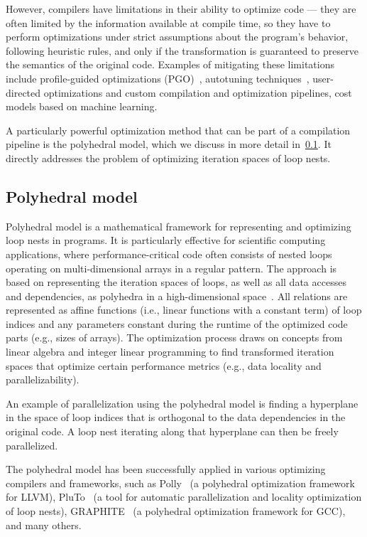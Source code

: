However, compilers have limitations in their ability to optimize code --- they are often limited by the information available at compile time, so they have to perform optimizations under strict assumptions about the program's behavior, following heuristic rules, and only if the transformation is guaranteed to preserve the semantics of the original code.
Examples of mitigating these limitations include profile-guided optimizations (PGO)~, autotuning techniques~, user-directed optimizations and custom compilation and optimization pipelines, cost models based on machine learning.

A particularly powerful optimization method that can be part of a compilation pipeline is the polyhedral model, which we discuss in more detail in~\cref{sec:polyhedral-model}. It directly addresses the problem of optimizing iteration spaces of loop nests.


\subsection{Polyhedral model}\label{sec:polyhedral-model}

Polyhedral model is a mathematical framework for representing and optimizing loop nests in programs. It is particularly effective for scientific computing applications, where performance-critical code often consists of nested loops operating on multi-dimensional arrays in a regular pattern. The approach is based on representing the iteration spaces of loops, as well as all data accesses and dependencies, as polyhedra in a high-dimensional space~. All relations are represented as affine functions (i.e., linear functions with a constant term) of loop indices and any parameters constant during the runtime of the optimized code parts (e.g., sizes of arrays). The optimization process draws on concepts from linear algebra and integer linear programming to find transformed iteration spaces that optimize certain performance metrics (e.g., data locality and parallelizability).

An example of parallelization using the polyhedral model is finding a hyperplane in the space of loop indices that is orthogonal to the data dependencies in the original code. A loop nest iterating along that hyperplane can then be freely parallelized.

The polyhedral model has been successfully applied in various optimizing compilers and frameworks, such as Polly~\cite{grosser2012polly} (a polyhedral optimization framework for LLVM), PluTo~\cite{bondhugula2008pluto} (a tool for automatic parallelization and locality optimization of loop nests), GRAPHITE~\cite{trifunovic2010graphite} (a polyhedral optimization framework for GCC), and many others.

